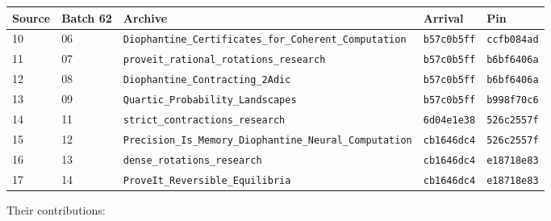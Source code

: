 \documentclass[11pt,letterpaper]{article}
\numberwithin{equation}{section}
\theoremstyle{definition}
\theoremstyle{remark}
\newcommand{\code}[1]{\nolinkurl{#1}}
\begin{document}
\begin{center}
\small
\begin{tabular}{@{}llp{}ll@{}}
\toprule
Source & Batch 62 & Archive & Arrival & Pin\\
\midrule
10 & 06 & \code{Diophantine_Certificates_for_Coherent_Computation} & \code{b57c0b5ff} & \code{ccfb084ad}\\
11 & 07 & \code{proveit_rational_rotations_research} & \code{b57c0b5ff} & \code{b6bf6406a}\\
12 & 08 & \code{Diophantine_Contracting_2Adic} & \code{b57c0b5ff} & \code{b6bf6406a}\\
13 & 09 & \code{Quartic_Probability_Landscapes} & \code{b57c0b5ff} & \code{b998f70c6}\\
14 & 11 & \code{strict_contractions_research} & \code{6d04e1e38} & \code{526c2557f}\\
15 & 12 & \code{Precision_Is_Memory_Diophantine_Neural_Computation} & \code{cb1646dc4} & \code{526c2557f}\\
16 & 13 & \code{dense_rotations_research} & \code{cb1646dc4} & \code{e18718e83}\\
17 & 14 & \code{ProveIt_Reversible_Equilibria} & \code{cb1646dc4} & \code{e18718e83}\\
\bottomrule
\end{tabular}
\end{center}
Their contributions:
\end{document}
